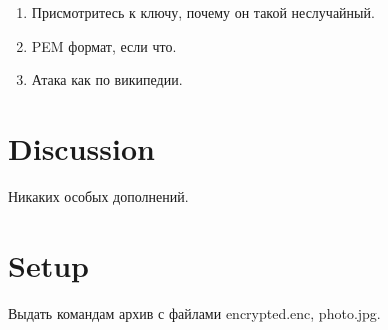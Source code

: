 \documentclass{article}
\begin{document}
\begin{enumerate}
\item Присмотритесь к ключу, почему он такой неслучайный.
\item PEM формат, если что.
\item Атака как по википедии.
\end{enumerate}

\section{Discussion}

Никаких особых дополнений.

\section{Setup}

Выдать командам архив с файлами encrypted.enc, photo.jpg.
\end{document}
